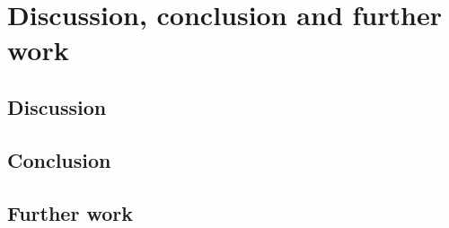 \chapter{Discussion, conclusion and further work} \label{ch:conclusion}

\section{Discussion}

\section{Conclusion}

\section{Further work}

